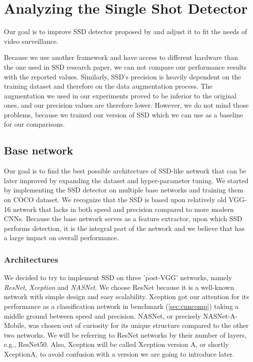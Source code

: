 \chapter{Analyzing the Single Shot Detector}


Our goal is to improve SSD detector proposed by \citeauthor{bib:ssd} and adjust it to fit the needs of video surveillance.  

Because we use another framework and have access to different hardware than the one used in SSD research paper, we can not compare our performance results with the reported values. Similarly, SSD's precision is heavily dependent on the training dataset and therefore on the data augmentation process. The augmentation we used in our experiments proved to be inferior to the original ones, and our precision values are therefore lower. However, we do not mind those problems, because we trained our version of SSD which we can use as a baseline for our comparisons. 

\section{Base network}
\label{sec:base}
Our goal is to find the best possible architecture of SSD-like network that can be later improved by expanding the dataset and hyper-parameter tuning. We started by implementing the SSD detector on multiple base networks and training them on COCO dataset. We recognize that the SSD is based upon relatively old VGG-16 network that lacks in both speed and precision compared to more modern CNNs. Because the base network serves as a feature extractor, upon which SSD performs detection, it is the integral part of the network and we believe that has a large impact on overall performance. 

\subsection{Architectures}
We decided to try to implement SSD on three 'post-VGG' networks, namely \textit{ResNet}, \textit{Xception} and \textit{NASNet}. We choose ResNet because it is a well-known network with simple design and easy scalability. Xception got our attention for its performance as a classification network in \citeauthor{bib:cnnbenchmark} benchmark (\cref{sec:cnncomp}) taking a middle ground between speed and precision. NASNet, or precisely NASNet-A-Mobile, was chosen out of curiosity for its unique structure compared to the other two networks. We will be referring to ResNet networks by their number of layers, e.g., ResNet50. Also, Xception will be called Xception version A, or shortly XceptionA, to avoid confusion with a version we are going to introduce later.

